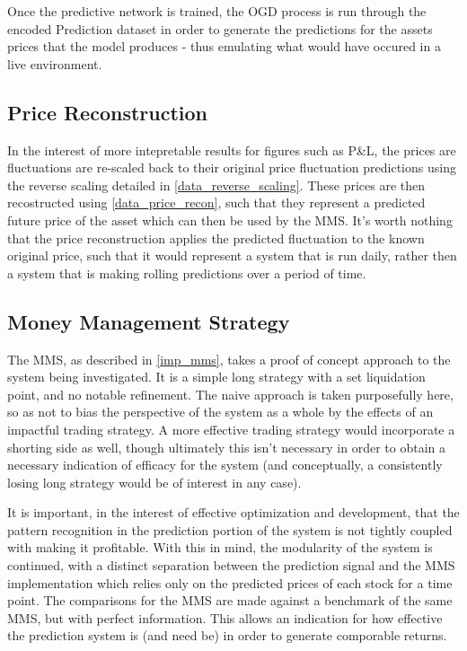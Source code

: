 \documentclass[a4paper,11pt,oneside]{article}
\theoremstyle{plain}
\theoremstyle{definition}
\begin{document}
Once the predictive network is trained, the OGD process is run through the encoded Prediction dataset in order to generate the predictions for the assets prices that the model produces - thus emulating what would have occured in a live environment. \newline

\subsection{Price Reconstruction}\label{proc_precerecon}

In the interest of more intepretable results for figures such as P\&L, the prices are fluctuations are re-scaled back to their original price fluctuation predictions using the reverse scaling detailed in \ref{data_reverse_scaling}. These prices are then recostructed using \ref{data_price_recon}, such that they represent a predicted future price of the asset which can then be used by the MMS. It's worth nothing that the price reconstruction applies the predicted fluctuation to the known original price, such that it would represent a system that is run daily, rather then a system that is making rolling predictions over a period of time.

\subsection{Money Management Strategy}\label{proc_mms}

The MMS, as described in \ref{imp_mms}, takes a proof of concept approach to the system being investigated. It is a simple long strategy with a set liquidation point, and no notable refinement. The naive approach is taken purposefully here, so as not to bias the perspective of the system as a whole by the effects of an impactful trading strategy. A more effective trading strategy would incorporate a shorting side as well, though ultimately this isn't necessary in order to obtain a necessary indication of efficacy for the system (and conceptually, a consistently losing long strategy would be of interest in any case).  \newline

It is important, in the interest of effective optimization and development, that the pattern recognition in the prediction portion of the system is not tightly coupled with making it profitable. With this in mind, the modularity of the system is continued, with a distinct separation between the prediction signal and the MMS implementation which relies only on the predicted prices of each stock for a time point. The comparisons for the MMS are made against a benchmark of the same MMS, but with perfect information. This allows an indication for how effective the prediction system is (and need be) in order to generate comporable returns. \newline {}
\end{document}
